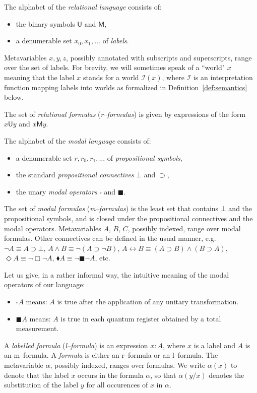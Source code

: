 \documentclass[times, 10pt]{article}
\newcommand{\varimp}{\supset}
\newcommand{\measB}{\blacksquare}
\newcommand{\measD}{\blacklozenge}
\newcommand{\uniB}{\square}
\newcommand{\Un}{\textsf{U}}
\newcommand{\Me}{\textsf{M}}
\renewcommand{\Un}{\mathsf{U}}
\renewcommand{\Me}{\mathsf{M}}
\newcommand{\I}{\mathscr{I}}
\begin{document}
The alphabet of the \emph{relational language} consists of:
\begin{itemize}
\item the binary symbols $\Un$ and $\Me$,
\item a denumerable set $x_0, x_1, \ldots$ of \textit{labels}.
\end{itemize}
Metavariables $x,y,z$, possibly annotated with subscripts and superscripts, range over the set of 
labels.
For brevity, we will sometimes speak of a ``world" $x$ meaning that the label $x$ stands for a world
$\I(x)$, where $\I$ is an interpretation function mapping labels into 
worlds as formalized in Definition~\ref{def:semantics} below.

The set of \textit{relational formulas} (\textit{r--formulas}) is given
by expressions of the form $x\Un y$ and $x\Me y$.

The alphabet of the \textit{modal language}  consists of:
\begin{itemize}
\item a denumerable set $r, r_0, r_1,\ldots$  of \textit{propositional symbols},
\item the standard \textit{propositional connectives} $\bot$ and $\varimp$,
\item the unary \textit{modal operators} $\uniB$ and $\measB$.
\end{itemize}
The set of \emph{modal formulas} (\emph{m--formulas}) is the least
set that contains $\bot$ and the propositional symbols, and is closed
under the propositional connectives and the modal operators.  
Metavariables $A$, $B$, $C$, possibly indexed, range over modal formulas.
Other connectives can be defined in the usual manner, e.g.~$\neg A \equiv A\varimp \bot$, 
$A \wedge B \equiv \neg (A \varimp \neg B)$, 
$A \leftrightarrow B \equiv (A \varimp B) \wedge (B \varimp A)$,
$\Diamond A \equiv \neg \Box \neg A$, $\measD A \equiv \neg \measB \neg A$, etc.

Let us give, in a rather informal way, the intuitive meaning of the modal operators of our language:
\begin{itemize}
 \item $\uniB A$ means: $A$ is true after the application of any
   unitary transformation.
\item $\measB A$ means: $A$ is true in each quantum register obtained by a total
  measurement.
\end{itemize}

A \emph{labelled formula} (\emph{l--formula}) 
is an expression $x:A$, where $x$ is a label and $A$ is an m--formula. 
A \emph{formula} is either an r--formula or an l--formula. The metavariable $\alpha$, possibly 
indexed, ranges over formulas. We write $\alpha(x)$ to denote that the label $x$ occurs in the 
formula $\alpha$, so that $\alpha(y/x)$ denotes the substitution of the label $y$ for all occurences of 
$x$ in $\alpha$.
\end{document}
